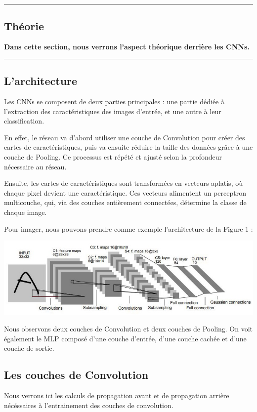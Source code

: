 {\color{gray}\hrule}
\begin{center}
\section{Théorie}
\textbf{Dans cette section, nous verrons l'aspect théorique derrière les CNNs.}
\bigskip
\end{center}
{\color{gray}\hrule}
\begin{multicols}{2}
\subsection{L'architecture}
Les CNNs se composent de deux parties principales :  
une partie dédiée à l’extraction des caractéristiques des images d’entrée, et une autre 
à leur classification.

En effet, le réseau va d'abord utiliser une couche de Convolution 
pour créer des cartes de caractéristiques, puis va ensuite réduire la taille des 
données grâce à une couche de Pooling. 
Ce processus est répété et ajusté selon la profondeur nécessaire au réseau.

Ensuite, les cartes de caractéristiques sont transformées en vecteurs aplatis, 
où chaque pixel devient une caractéristique. Ces vecteurs alimentent un perceptron
multicouche, qui, via des couches entièrement connectées, détermine la classe de 
chaque image.

Pour imager, nous pouvons prendre comme exemple l'architecture de la Figure 1 : 


\includegraphics[width=\columnwidth]{images/lenet5.jpeg}
\hfill\break

Nous observons deux couches de Convolution et deux couches de Pooling. On voit également le  
MLP composé d'une couche d'entrée, d'une couche cachée et d'une couche de sortie.

\subsection{Les couches de Convolution}
Nous verrons ici les calculs de propagation avant et de propagation arrière nécéssaires 
à l'entrainement des couches de convolution.\\


\end{multicols}
